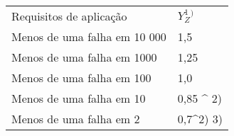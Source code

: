 \begin{table}[]
\begin{tabular}{ll}
Requisitos de aplicação      & $Y_Z^1^)$    \\
Menos de uma falha em 10 000 & 1,5       \\
Menos de uma falha em 1000   & 1,25      \\
Menos de uma falha em 100    & 1,0       \\
Menos de uma falha em 10     & 0,85 ^ 2)   \\
Menos de uma falha em 2      & 0,7^2) 3)
\end{tabular}
\end{table}